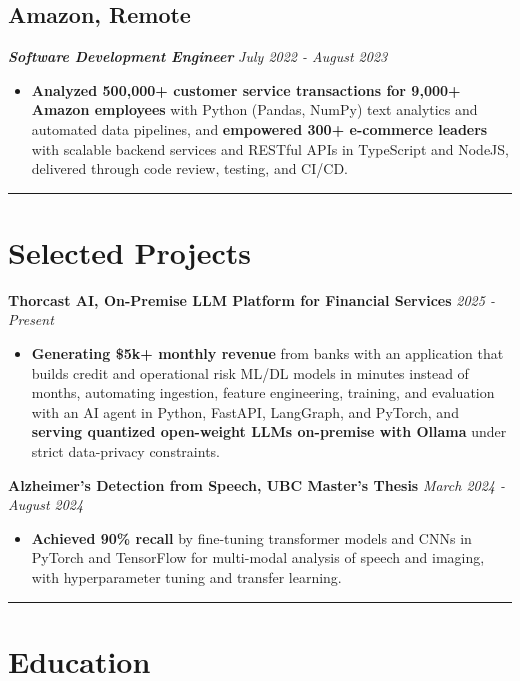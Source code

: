 \documentclass[9pt,a4paper]{extarticle}
\begin{document}
\subsection*{Amazon, Remote}
{\fontsize{10}{11} \textbf{\textit{Software Development Engineer}}} \hfill \textit{July 2022 - August 2023}
\begin{itemize}[noitemsep]
    \item \textbf{Analyzed 500,000+ customer service transactions for 9,000+ Amazon employees} with Python (Pandas, NumPy) text analytics and automated data pipelines, and \textbf{empowered 300+ e-commerce leaders} with scalable backend services and RESTful APIs in TypeScript and NodeJS, delivered through code review, testing, and CI/CD.
\end{itemize}


\rule{\textwidth}{0.4pt}

\section*{Selected Projects}

\textbf{Thorcast AI, On-Premise LLM Platform for Financial Services} \hfill \textit{2025 - Present}
\begin{itemize}[noitemsep]
    \item \textbf{Generating \$5k+ monthly revenue} from banks with an application that builds credit and operational risk ML/DL models in minutes instead of months, automating ingestion, feature engineering, training, and evaluation with an AI agent in Python, FastAPI, LangGraph, and PyTorch, and \textbf{serving quantized open-weight LLMs on-premise with Ollama} under strict data-privacy constraints.
\end{itemize}

\textbf{Alzheimer's Detection from Speech, UBC Master's Thesis} \hfill \textit{March 2024 - August 2024}
\begin{itemize}[noitemsep]
    \item \textbf{Achieved 90\% recall} by fine-tuning transformer models and CNNs in PyTorch and TensorFlow for multi-modal analysis of speech and imaging, with hyperparameter tuning and transfer learning.
\end{itemize}

\rule{\textwidth}{0.4pt}

\section*{Education}
\end{document}
